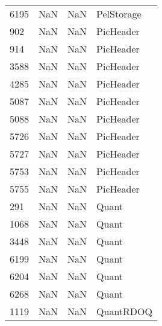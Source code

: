 \begin{tabular}{llll}
6195 &                   NaN &                        NaN &                                PelStorage \\
902  &                   NaN &                        NaN &                                 PicHeader \\
914  &                   NaN &                        NaN &                                 PicHeader \\
3588 &                   NaN &                        NaN &                                 PicHeader \\
4285 &                   NaN &                        NaN &                                 PicHeader \\
5087 &                   NaN &                        NaN &                                 PicHeader \\
5088 &                   NaN &                        NaN &                                 PicHeader \\
5726 &                   NaN &                        NaN &                                 PicHeader \\
5727 &                   NaN &                        NaN &                                 PicHeader \\
5753 &                   NaN &                        NaN &                                 PicHeader \\
5755 &                   NaN &                        NaN &                                 PicHeader \\
291  &                   NaN &                        NaN &                                     Quant \\
1068 &                   NaN &                        NaN &                                     Quant \\
3448 &                   NaN &                        NaN &                                     Quant \\
6199 &                   NaN &                        NaN &                                     Quant \\
6204 &                   NaN &                        NaN &                                     Quant \\
6268 &                   NaN &                        NaN &                                     Quant \\
1119 &                   NaN &                        NaN &                                 QuantRDOQ \\

\end{tabular}

